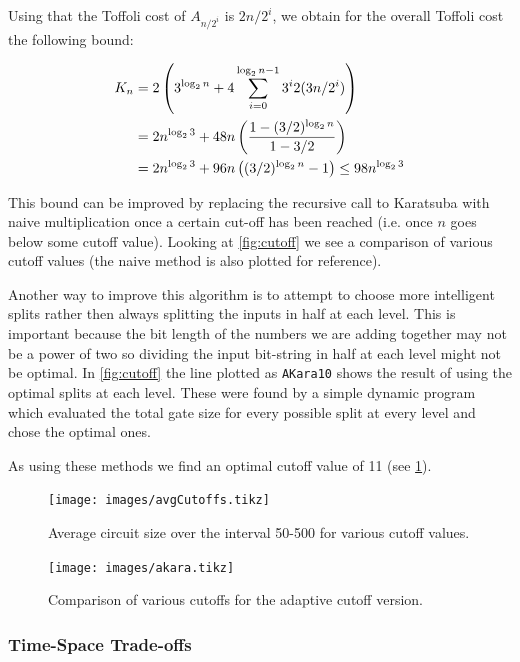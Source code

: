       Using that the Toffoli cost of $A_{n/2^i}$ is $2n/2^i$, we obtain for
      the overall Toffoli cost the following bound:

      \begin{align}
        K_n &= 2\left(3^{\log_2 n } + 4 \sum_{i=0}^{\log_2 n - 1} 3^i 2(3n/2^i)\right)\notag\\
            &= 2n^{\log_2 3} + 48n \left(\frac{1- (3/2)^{\log_2 n}}{1-3/2}\right) \notag\\
            &= 2n^{\log_2 3} + 96n \left((3/2)^{\log_2{n}} -1\right) \leq 98 n^{\log_2{3}}
      \end{align}

      This bound can be improved by replacing the recursive call to Karatsuba
      with naive multiplication once a certain cut-off has been reached (i.e. once
      $n$ goes below some cutoff value).  Looking at \cref{fig:cutoff} we see a
      comparison of various cutoff values (the naive method is also plotted for
      reference).

      Another way to improve this algorithm is to attempt to choose more
      intelligent splits rather then always splitting the inputs in half at
      each level.  This is important because the bit length of the numbers we
      are adding together may not be a power of two so dividing the input
      bit-string in half at each level might not be optimal.  In
      \cref{fig:cutoff} the line plotted as \verb+AKara10+ shows the result of
      using the optimal splits at each level.  These were found by a simple
      dynamic program which evaluated the total gate size for every possible
      split at every level and chose the optimal ones.

      As using these methods we find an optimal cutoff value of 11 (see
      \cref{fig:cutoffs}).

      \begin{figure}[p]
        \capstart
        \texttt{[image: images/avgCutoffs.tikz]}
        \caption{Average circuit size over the interval 50-500 for various cutoff values.}
        \label{fig:cutoffs}
      \end{figure}
      \begin{figure}[p]
        \capstart
        \texttt{[image: images/akara.tikz]}
        \caption{Comparison of various cutoffs for the adaptive cutoff version.}
        \label{fig:aKara}
     \end{figure}

\subsubsection{Time-Space Trade-offs}

